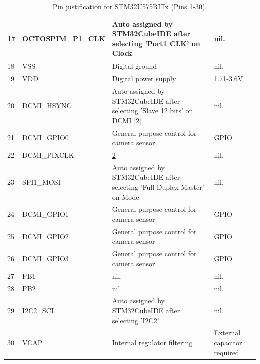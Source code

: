 \begin{table}[H]
\begin{tabular}{|l|p{3cm}|p{6cm}|p{4.5cm}|}
        17 & OCTOSPIM\_P1\_CLK & Auto assigned by STM32CubeIDE after selecting 'Port1 CLK' on Clock & nil. \\ \hline
        18 & VSS & Digital ground & nil. \\ \hline
        19 & VDD & Digital power supply & 1.71-3.6V \\ \hline
        20 & DCMI\_HSYNC & Auto assigned by STM32CubeIDE after selecting 'Slave 12 bits' on DCMI \hypertarget{dcmi-reason}{[2]} & nil. \\ \hline
        21 & DCMI\_GPIO0 & General purpose control for camera sensor & GPIO \\ \hline
        22 & DCMI\_PIXCLK & \hyperlink{dcmi-reason}{2} & nil. \\ \hline
        23 & SPI1\_MOSI & Auto assigned by STM32CubeIDE after selecting 'Full-Duplex Master' on Mode & nil. \\ \hline
        24 & DCMI\_GPIO1 & General purpose control for camera sensor & GPIO \\ \hline
        25 & DCMI\_GPIO2 & General purpose control for camera sensor & GPIO \\ \hline
        26 & DCMI\_GPIO3 & General purpose control for camera sensor & GPIO \\ \hline
        27 & PB1 & nil. & nil. \\ \hline
        28 & PB2 & nil. & nil. \\ \hline
        29 & I2C2\_SCL & Auto assigned by STM32CubeIDE after selecting 'I2C2' & nil. \\ \hline
        30 & VCAP & Internal regulator filtering & External capacitor required \\ \hline
    \end{tabular}
    \caption{Pin justification for STM32U575RITx (Pins 1-30).}
    \label{tab:stm32u575-pin-justification-1}
\end{table}

